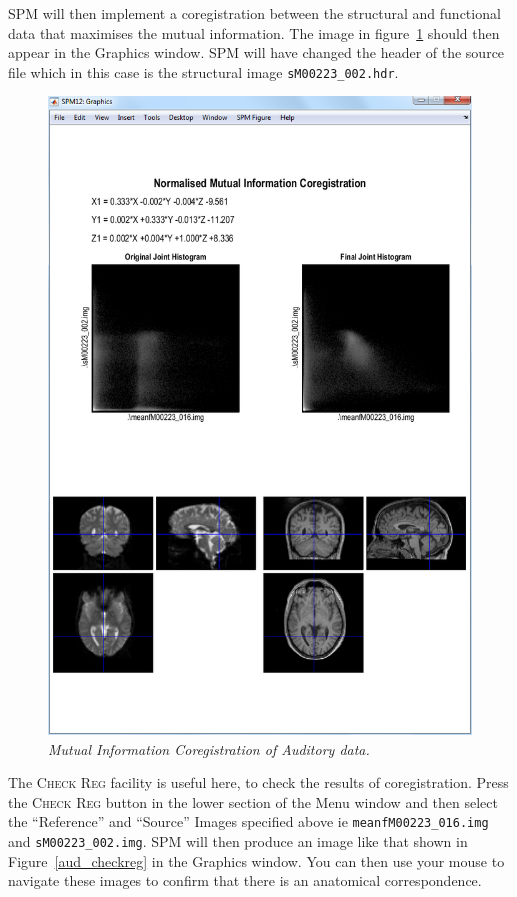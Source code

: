 SPM will then implement a coregistration between the structural and functional data that maximises the mutual information. The image in figure~\ref{aud_coreg} should then appear in the Graphics window. SPM will have changed the header of the source file which in this case is the structural image \texttt{sM00223\_002.hdr}.
\begin{figure}
\begin{center}
\includegraphics[width=125mm]{auditory/coreg}
\caption{\em Mutual Information Coregistration of Auditory data.\label{aud_coreg}}
\end{center}
\end{figure}

The \textsc{Check Reg} facility is useful here, to check the results of coregistration. Press the \textsc{Check Reg} button in the lower section of the Menu window and then select the ``Reference'' and ``Source'' Images specified above ie \texttt{meanfM00223\_016.img} and \texttt{sM00223\_002.img}. SPM will then produce an image like that shown in Figure~\ref{aud_checkreg} in the Graphics window. You can then use your mouse to navigate these images to confirm that there is an anatomical correspondence.

